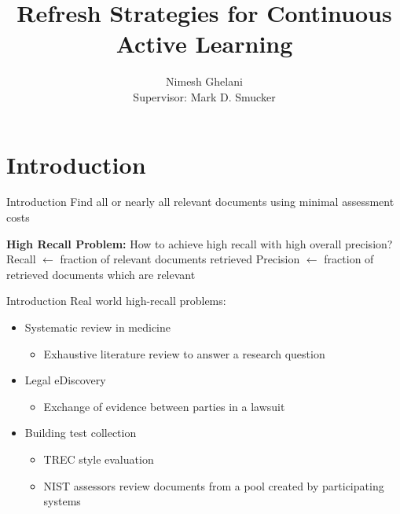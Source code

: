 \documentclass[14pt]{beamer}
\title[Your Short Title]{Refresh Strategies for Continuous Active Learning}
\author{Nimesh Ghelani\\Supervisor: Mark D. Smucker}
\institute{University of Waterloo}
\date{}
\begin{document}

\begin{frame}
  \titlepage
\end{frame}

\section{Introduction}
\begin{frame}{Introduction}
    Find all or nearly all relevant documents using minimal assessment costs
    \vskip 1cm

    \pause
    \textbf{High Recall Problem: } How to achieve high recall with high overall
    precision?
    \vskip 1cm
    Recall $\leftarrow$ fraction of relevant documents retrieved
    Precision $\leftarrow$ fraction of retrieved documents which are relevant
\end{frame}

\begin{frame}{Introduction}
    Real world high-recall problems:

    \begin{itemize}
    \item Systematic review in medicine~\cite{yu2016read}
            \begin{itemize}
                \item Exhaustive literature review to answer a research question
            \end{itemize}
        \pause
        \item Legal eDiscovery~\cite{oard2013information}
        \begin{itemize}
            \item Exchange of evidence between parties in a lawsuit
        \end{itemize}
        \pause
        \item Building test collection
            \begin{itemize}
                \item TREC style evaluation
                \item NIST assessors review documents from a pool created by
                    participating systems~\cite{harman1993overview}
            \end{itemize}
    \end{itemize}

\end{frame}
\end{document}
